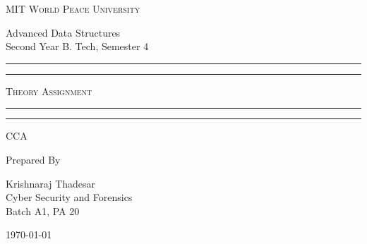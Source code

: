 \documentclass[11pt]{article}
\begin{document}
\begin{titlepage}
    \centering


    \huge\textsc{
        MIT World Peace University
    }\\

    \vspace{0.75\baselineskip} %

    \LARGE{
        Advanced Data Structures\\
        Second Year B. Tech, Semester 4
    }

    \vfill %


    \rule{\textwidth}{1.6pt}\vspace*{-\baselineskip}\vspace*{2pt}
    \rule{\textwidth}{0.6pt}
    \vspace{0.75\baselineskip} %



    \huge{\textsc{
            Theory Assignment
        }} \\



    \vspace{0.5\baselineskip} %
    \rule{\textwidth}{0.6pt}\vspace*{-\baselineskip}\vspace*{2.8pt}
    \rule{\textwidth}{1.6pt}

    \vspace{1\baselineskip} %


    \LARGE\textsc{
        CCA
    } %
    \vfill


    Prepared By
    \vspace{0.5\baselineskip} %

    \Large{
        Krishnaraj Thadesar \\
        Cyber Security and Forensics\\
        Batch A1, PA 20
    }


    \vspace{0.5\baselineskip} %
    \today

\end{titlepage}
\end{document}

